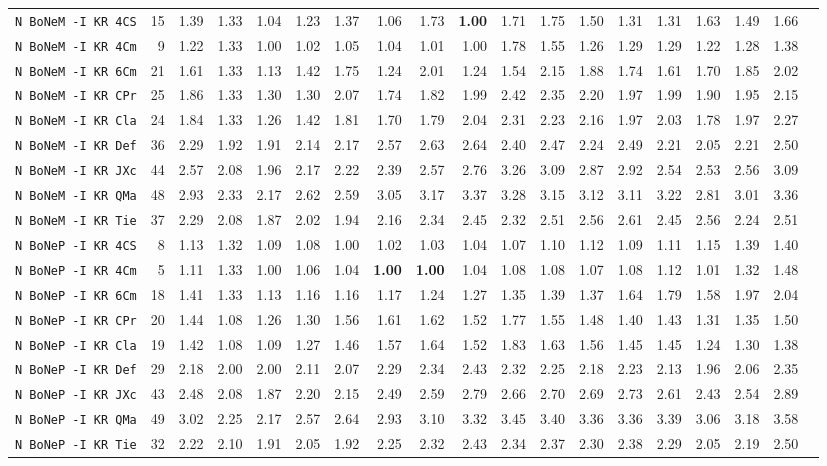 \begin{tabular}{l | r @{~~} r | r@{~~}r@{~~}r@{~~}r@{~~}r@{~~}r@{~~}r@{~~}r@{~~}r@{~~}r@{~~}r@{~~}r@{~~}r@{~~}r@{~~}r@{~~}r|}
\verb+N BoNeM -I KR 4CS+ & 15 & 1.39 & 1.33&1.04&1.23&1.37&1.06&1.73&\textbf{1.00}&1.71&1.75&1.50&1.31&1.31&1.63&1.49&1.66\\
\verb+N BoNeM -I KR 4Cm+ & 9 & 1.22 & 1.33&1.00&1.02&1.05&1.04&1.01&1.00&1.78&1.55&1.26&1.29&1.29&1.22&1.28&1.38\\
\verb+N BoNeM -I KR 6Cm+ & 21 & 1.61 & 1.33&1.13&1.42&1.75&1.24&2.01&1.24&1.54&2.15&1.88&1.74&1.61&1.70&1.85&2.02\\
\verb+N BoNeM -I KR CPr+ & 25 & 1.86 & 1.33&1.30&1.30&2.07&1.74&1.82&1.99&2.42&2.35&2.20&1.97&1.99&1.90&1.95&2.15\\
\verb+N BoNeM -I KR Cla+ & 24 & 1.84 & 1.33&1.26&1.42&1.81&1.70&1.79&2.04&2.31&2.23&2.16&1.97&2.03&1.78&1.97&2.27\\
\verb+N BoNeM -I KR Def+ & 36 & 2.29 & 1.92&1.91&2.14&2.17&2.57&2.63&2.64&2.40&2.47&2.24&2.49&2.21&2.05&2.21&2.50\\
\verb+N BoNeM -I KR JXc+ & 44 & 2.57 & 2.08&1.96&2.17&2.22&2.39&2.57&2.76&3.26&3.09&2.87&2.92&2.54&2.53&2.56&3.09\\
\verb+N BoNeM -I KR QMa+ & 48 & 2.93 & 2.33&2.17&2.62&2.59&3.05&3.17&3.37&3.28&3.15&3.12&3.11&3.22&2.81&3.01&3.36\\
\verb+N BoNeM -I KR Tie+ & 37 & 2.29 & 2.08&1.87&2.02&1.94&2.16&2.34&2.45&2.32&2.51&2.56&2.61&2.45&2.56&2.24&2.51\\
\verb+N BoNeP -I KR 4CS+ & 8 & 1.13 & 1.32&1.09&1.08&1.00&1.02&1.03&1.04&1.07&1.10&1.12&1.09&1.11&1.15&1.39&1.40\\
\verb+N BoNeP -I KR 4Cm+ & 5 & 1.11 & 1.33&1.00&1.06&1.04&\textbf{1.00}&\textbf{1.00}&1.04&1.08&1.08&1.07&1.08&1.12&1.01&1.32&1.48\\
\verb+N BoNeP -I KR 6Cm+ & 18 & 1.41 & 1.33&1.13&1.16&1.16&1.17&1.24&1.27&1.35&1.39&1.37&1.64&1.79&1.58&1.97&2.04\\
\verb+N BoNeP -I KR CPr+ & 20 & 1.44 & 1.08&1.26&1.30&1.56&1.61&1.62&1.52&1.77&1.55&1.48&1.40&1.43&1.31&1.35&1.50\\
\verb+N BoNeP -I KR Cla+ & 19 & 1.42 & 1.08&1.09&1.27&1.46&1.57&1.64&1.52&1.83&1.63&1.56&1.45&1.45&1.24&1.30&1.38\\
\verb+N BoNeP -I KR Def+ & 29 & 2.18 & 2.00&2.00&2.11&2.07&2.29&2.34&2.43&2.32&2.25&2.18&2.23&2.13&1.96&2.06&2.35\\
\verb+N BoNeP -I KR JXc+ & 43 & 2.48 & 2.08&1.87&2.20&2.15&2.49&2.59&2.79&2.66&2.70&2.69&2.73&2.61&2.43&2.54&2.89\\
\verb+N BoNeP -I KR QMa+ & 49 & 3.02 & 2.25&2.17&2.57&2.64&2.93&3.10&3.32&3.45&3.40&3.36&3.36&3.39&3.06&3.18&3.58\\
\verb+N BoNeP -I KR Tie+ & 32 & 2.22 & 2.10&1.91&2.05&1.92&2.25&2.32&2.43&2.34&2.37&2.30&2.38&2.29&2.05&2.19&2.50\\
\end{tabular}
